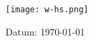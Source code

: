 
\begin{titlepage}

\centering
\texttt{[image: w-hs.png]}
\par\vspace{5cm}
{\Huge\textbf{\titlename}\par}
\vspace{1cm}
{\large\scshape{\authorname}\par}
\vfill
{\large Datum: \today\par}

\end{titlepage}